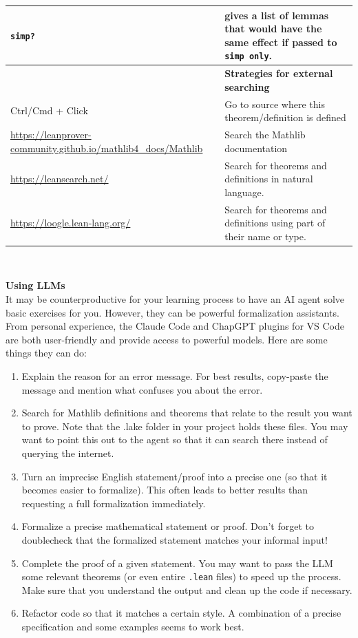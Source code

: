 \documentclass[a4paper]{article}
\newcommand{\lean}[1]{{\tt #1}}
\begin{document}
\begin{center}
\begin{longtable}{@{}lp{113mm}@{}}
  \lean{simp?} & gives a list of lemmas that would have the same effect if passed to \lean{simp only}. \\
  \hline
  &\textbf{Strategies for external searching} \\
  Ctrl/Cmd + Click & Go to source where this theorem/definition is defined \\
  \url{https://leanprover-community.github.io/mathlib4_docs/Mathlib} & Search the Mathlib documentation \\
  \url{https://leansearch.net/} & Search for theorems and definitions in natural language. \\
  \url{https://loogle.lean-lang.org/} & Search for theorems and definitions using part of their name or type. \\
  \bottomrule
\end{longtable}
\mbox{}\\
\end{center}

\textbf{Using LLMs}\\
It may be counterproductive for your learning process to have an AI agent solve basic exercises for you. However, they can be powerful formalization assistants.
From personal experience, the Claude Code and ChapGPT plugins for VS Code are both user-friendly and provide access to powerful models.
Here are some things they can do: 

\begin{enumerate}
	\item Explain the reason for an error message. For best results, copy-paste the message and mention what confuses you about the error.
	\item Search for Mathlib definitions and theorems that relate to the result you want to prove. Note that the .lake folder in your project holds these files. You may want to point this out to the agent so that it can search there instead of querying the internet.
	\item Turn an imprecise English statement/proof into a precise one (so that it becomes easier to formalize). This often leads to better results than requesting a full formalization immediately.
	\item Formalize a precise mathematical statement or proof. Don't forget to doublecheck that the formalized statement matches your informal input!
	\item Complete the proof of a given statement. You may want to pass the LLM some relevant theorems (or even entire \verb*|.lean| files) to speed up the process. Make sure that you understand the output and clean up the code if necessary.
	\item Refactor code so that it matches a certain style. A combination of a precise specification and some examples seems to work best.
\end{enumerate}
\end{document}
